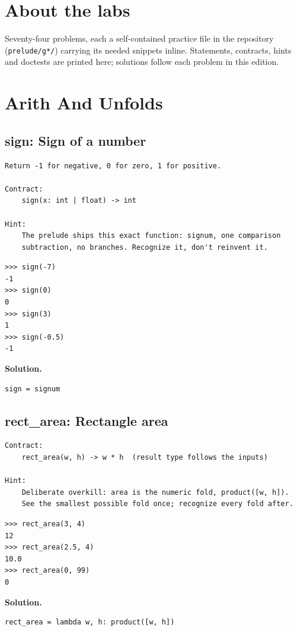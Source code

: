 \documentclass[10pt,letterpaper]{book}
\begin{document}
\chapter*{About the labs}
Seventy-four problems, each a self-contained practice file in the repository
(\texttt{prelude/g*/}) carrying its needed snippets inline. Statements,
contracts, hints and doctests are printed here; solutions follow each problem in this edition.
\chapter{Arith And Unfolds}

\section{sign: Sign of a number}
\begin{lstlisting}[style=ex]
Return -1 for negative, 0 for zero, 1 for positive.

Contract:
    sign(x: int | float) -> int

Hint:
    The prelude ships this exact function: signum, one comparison
    subtraction, no branches. Recognize it, don't reinvent it.
\end{lstlisting}
\begin{lstlisting}[style=ex]
>>> sign(-7)
-1
>>> sign(0)
0
>>> sign(3)
1
>>> sign(-0.5)
-1
\end{lstlisting}
\noindent\textbf{Solution.}
\begin{lstlisting}[style=code]
sign = signum
\end{lstlisting}

\section{rect\_area: Rectangle area}
\begin{lstlisting}[style=ex]
Contract:
    rect_area(w, h) -> w * h  (result type follows the inputs)

Hint:
    Deliberate overkill: area is the numeric fold, product([w, h]).
    See the smallest possible fold once; recognize every fold after.
\end{lstlisting}
\begin{lstlisting}[style=ex]
>>> rect_area(3, 4)
12
>>> rect_area(2.5, 4)
10.0
>>> rect_area(0, 99)
0
\end{lstlisting}
\noindent\textbf{Solution.}
\begin{lstlisting}[style=code]
rect_area = lambda w, h: product([w, h])
\end{lstlisting}
\end{document}
